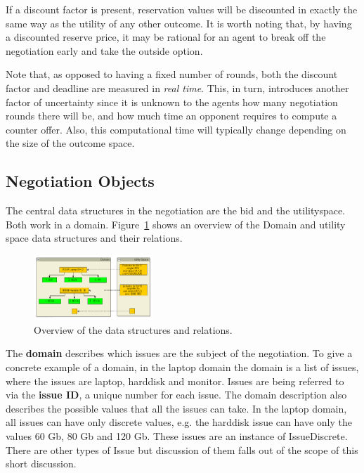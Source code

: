 \documentclass[]{article}
\begin{document}
If a discount factor is present, reservation values will be discounted in exactly the same way as the utility of any other outcome. It is worth noting that, by having a discounted reserve price, it may be rational for an agent to break off the negotiation early and take the outside option.

Note that, as opposed to having a fixed number of rounds, both the discount factor and deadline are measured in {\it real time}. This, in turn, introduces another factor of uncertainty since it is unknown to the agents how many negotiation rounds there will be, and how much time an opponent requires to compute a counter offer. Also, this computational time will typically change depending on the size of the outcome space. 

\subsection{Negotiation Objects}
The central data structures in the negotiation are the bid and the utilityspace. Both work in a domain. Figure~\ref{Fig:data structure and relation overview} shows an overview of the Domain and utility space data structures and their relations.

\begin{figure}[htb]
	\centering
	\includegraphics[width=0.4\textwidth]{media/datastructures.png}
\caption{Overview of the data structures and relations.}\label{Fig:data structure and relation overview}
\end{figure}

The {\bf domain} describes which issues are the subject of the negotiation. To give a concrete example of a domain, in the laptop domain the domain is a list of issues, where the issues are laptop, harddisk and monitor. Issues are being referred to via the {\bf issue ID},  a unique number for each issue. The domain description also describes the possible values that all the issues can take. In the laptop domain, all issues can have only discrete values, e.g. the harddisk issue can have only the values 60 Gb, 80 Gb and 120 Gb. These issues are an instance of IssueDiscrete. There are other types of Issue but discussion of them falls out of the scope of this short discussion.
\end{document}
